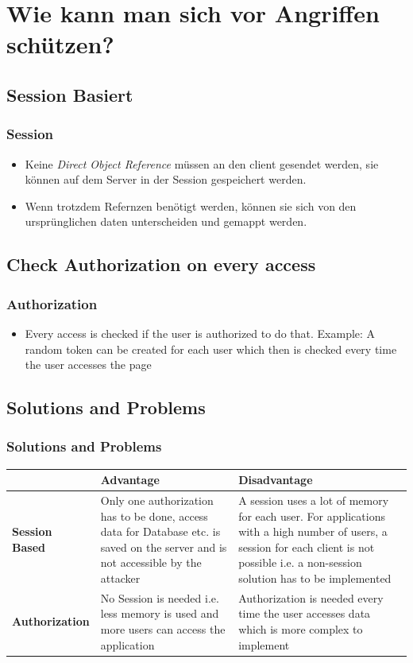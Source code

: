 \documentclass[aspectratio=169]{beamer}
\begin{document}
\section{Wie kann man sich vor Angriffen schützen?}

\subsection{Session Basiert}

\begin{frame}
  \frametitle{Session}
  \begin{itemize}
  \item Keine \textit{Direct Object Reference} müssen an den client gesendet werden, sie können auf dem Server in der Session gespeichert werden.
  \item Wenn trotzdem Refernzen benötigt werden, können sie sich von den ursprünglichen daten unterscheiden und gemappt werden.
  \end{itemize}
\end{frame}

\subsection{Check Authorization on every access}

\begin{frame}
  \frametitle{Authorization}
  \begin{itemize}
    \item Every access is checked if the user is authorized to do that. Example: A random token can be created for each user which then is checked every time the user accesses the page
  \end{itemize}
\end{frame}

\subsection{Solutions and Problems}

\begin{frame}
  \frametitle{Solutions and Problems}
\tiny
  \begin{tabular}{|l|p{4cm}|p{4cm}|}
    \hline
    & \textbf{Advantage} & \textbf{Disadvantage} \\\hline
    \textbf{Session Based} & Only one authorization has to be done, access data for Database etc. is saved on the server and is not accessible by the attacker & A session uses a lot of memory for each user. For applications with a high number of users, a session for each client is not possible i.e. a non-session solution has to be implemented \\\hline
    \textbf{Authorization} & No Session is needed i.e. less memory is used and more users can access the application & Authorization is needed every time the user accesses data which is more complex to implement\\\hline
  \end{tabular}
\end{frame}
\end{document}
